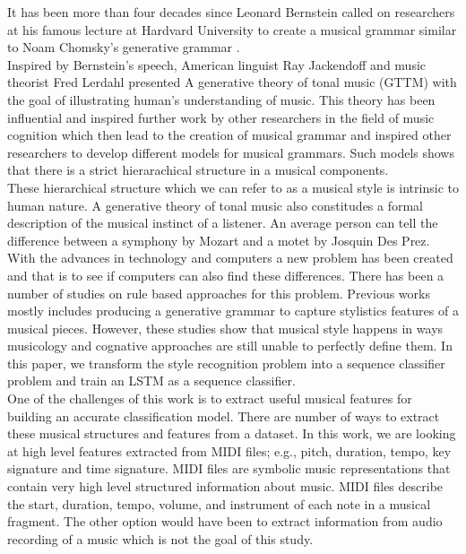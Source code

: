 \documentclass[11pt,a4paper]{article}
\begin{document}
It has been more than four decades since Leonard Bernstein called on researchers at his famous lecture at Hardvard University \cite{Bernstein} to create a musical grammar similar to Noam Chomsky's generative grammar \cite{Chomsky}.\\
Inspired by Bernstein's speech, American linguist Ray Jackendoff and music theorist Fred Lerdahl presented A generative theory of tonal music (GTTM) with the goal of illustrating human's understanding of music. This theory has been influential and inspired further work by other researchers in the field of music cognition which then lead to the creation of musical grammar and inspired other researchers to develop different models for musical grammars. Such models shows that there is a strict hierarachical structure in a musical components. \\
These hierarchical structure which we can refer to as a musical style is intrinsic to human nature. A generative theory of tonal music also constitudes a formal description of the musical instinct of a listener. An average person can tell the difference between a symphony by Mozart and a motet by Josquin Des Prez. With the advances in technology and computers a new problem has been created and that is to see if computers can also find these differences. There has been a number of studies on rule based approaches for this problem. Previous works mostly includes producing a generative grammar to capture stylistics features of a musical pieces. However, these studies show that musical style happens in ways musicology and cognative approaches are still unable to perfectly define them. In this paper, we transform the style recognition problem into a sequence classifier problem and train an LSTM as a sequence classifier.\\
One of the challenges of this work is to extract useful musical features for building an accurate classification model. There are number of ways to extract these musical structures and features from a dataset.  In this work, we are looking at high level features extracted from MIDI files; e.g., pitch, duration, tempo, key signature and time signature. MIDI files are symbolic music representations that contain very high level structured information about music. MIDI files describe the start, duration, tempo, volume, and instrument of each note in a musical fragment. The other option would have been to extract information from audio recording of a music which is not the goal of this study.\\ 
\end{document}
